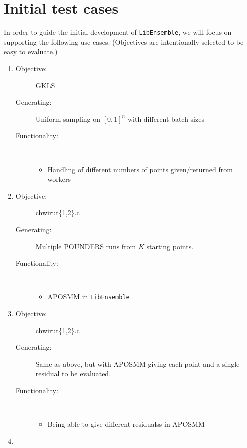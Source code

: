 \documentclass{article}
\newcommand{\libE}{\texttt{LibEnsemble}}
\begin{document}
\section{Initial test cases}
In order to guide the initial development of \libE, we will focus on supporting the following use cases. (Objectives are intentionally selected to be easy to evaluate.)
\begin{enumerate}
  \item 
    \begin{description}
      \item[Objective:] GKLS
      \item[Generating:] Uniform sampling on $[0,1]^n$ with different batch sizes
      \item[Functionality:] \
        \begin{itemize}
          \item Handling of different numbers of points given/returned from workers
        \end{itemize}
    \end{description}
    \bigskip
  \item 
    \begin{description}
      \item[Objective:] chwirut\{1,2\}.c
      \item[Generating:] Multiple POUNDERS runs from $K$ starting points.
      \item[Functionality:] \
        \begin{itemize}
          \item APOSMM in \libE
        \end{itemize}
    \end{description}
    \bigskip
  \item 
    \begin{description}
      \item[Objective:] chwirut\{1,2\}.c
      \item[Generating:] Same as above, but with APOSMM giving each point and a single residual to be evaluated.
      \item[Functionality:] \
        \begin{itemize}
          \item Being able to give different residualss in APOSMM 
        \end{itemize}
    \end{description}
    \bigskip
  \item 
    \begin{description}

\end{description}
\end{enumerate}
\end{document}
